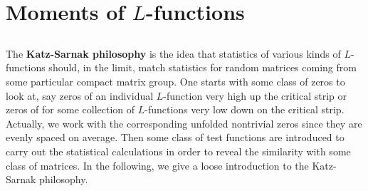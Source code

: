 \chapter{Moments of \texorpdfstring{$L$}{L}-functions}
  \section{}
  \section{}
  \section{}
  \section{}
    The \textbf{Katz-Sarnak philosophy} is the idea that statistics of various kinds of $L$-functions should, in the limit, match statistics for random matrices coming from some particular compact matrix group. One starts with some class of zeros to look at, say zeros of an individual $L$-function very high up the critical strip or zeros of for some collection of $L$-functions very low down on the critical strip. Actually, we work with the corresponding unfolded nontrivial zeros since they are evenly spaced on average. Then some class of test functions are introduced to carry out the statistical calculations in order to reveal the similarity with some class of matrices. In the following, we give a loose introduction to the Katz-Sarnak philosophy.
